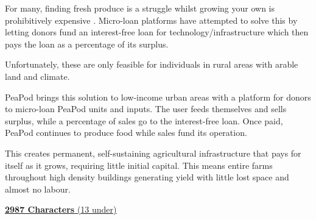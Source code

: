 \documentclass{../tex/report}
\begin{document}
For many, finding fresh produce is a struggle whilst growing your own is prohibitively expensive \cite{foodsecurity}. Micro-loan platforms have attempted to solve this by letting donors fund an interest-free loan for technology/infrastructure which then pays the loan as a percentage of its surplus. 

Unfortunately, these are only feasible for individuals in rural areas with arable land and climate.

PeaPod brings this solution to low-income urban areas with a platform for donors to micro-loan PeaPod units and inputs. The user feeds themselves and sells surplus, while a percentage of sales go to the interest-free loan. Once paid, PeaPod continues to produce food while sales fund its operation. 

This creates permanent, self-sustaining agricultural infrastructure that pays for itself as it grows, requiring little initial capital. This means entire farms throughout high density buildings generating yield with little lost space and almost no labour.

\uline{\textbf{2987 Characters} (13 under)}

\newpage

\appendix
\end{document}
